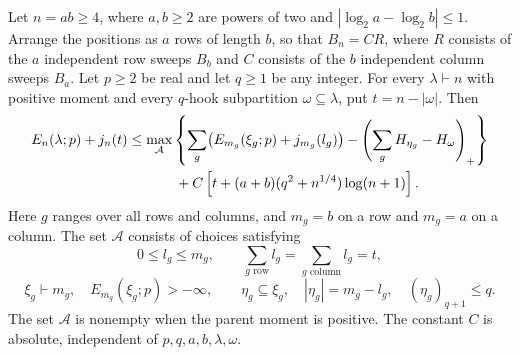 \begin{proposition}
\label{s:general-marked-recurrence}
Let $n=ab\ge4$, where $a,b\ge2$ are powers of two and
$|\log_2a-\log_2b|\le1$.  Arrange the positions as $a$ rows of length
$b$, so that $B_n=CR$, where $R$ consists of the $a$ independent row
sweeps $B_b$ and $C$ consists of the $b$ independent column sweeps $B_a$.
Let $p\ge2$ be real and let $q\ge1$ be any integer.  For every
$\lambda\vdash n$ with positive moment and every $q$-hook subpartition
$\omega\subseteq\lambda$, put $t=n-|\omega|$.  Then
\begin{align}
 E_n(\lambda;p)+j_n(t)
 &\le \max_{\mathcal A}\left\{
    \sum_g\bigl(E_{m_g}(\xi_g;p)+j_{m_g}(l_g)\bigr)
      -\left(\sum_g H_{\eta_g}-H_\omega\right)_+
                         \right\}\notag\\
 &\hspace{12mm}
    +C\left[t+(a+b)(q^2+n^{1/4})\log(n+1)\right].
 \label{s:eq:general-marked-recurrence}
\end{align}
Here $g$ ranges over all rows and columns, and $m_g=b$ on a row and
$m_g=a$ on a column.  The set $\mathcal A$ consists of choices satisfying
\[
 0\le l_g\le m_g,\qquad
 \sum_{g\text{ row}}l_g=\sum_{g\text{ column}}l_g=t,
\]
\[
 \xi_g\vdash m_g,\quad E_{m_g}(\xi_g;p)>-\infty,
 \qquad \eta_g\subseteq\xi_g,\quad |\eta_g|=m_g-l_g,
 \quad (\eta_g)_{q+1}\le q.
\]
The set $\mathcal A$ is nonempty when the parent moment is positive.
The constant $C$ is absolute, independent of $p,q,a,b,\lambda,\omega$.
\end{proposition}

